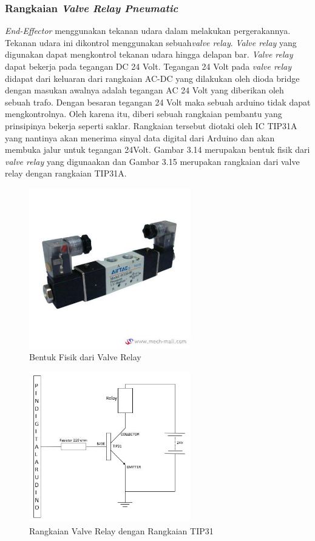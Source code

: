 \subsubsection{Rangkaian \textit{Valve Relay Pneumatic}}
\textit{End-Effector} menggunakan tekanan udara dalam melakukan pergerakannya. Tekanan udara ini dikontrol menggunakan sebuah\textit{valve relay}. \textit{Valve relay} yang digunakan dapat mengkontrol tekanan udara hingga delapan bar. \textit{Valve relay} dapat bekerja pada tegangan DC 24 Volt. Tegangan 24 Volt pada \textit{valve relay} didapat dari keluaran dari rangkaian AC-DC yang dilakukan oleh dioda bridge dengan masukan awalnya adalah tegangan AC 24 Volt yang diberikan oleh sebuah trafo. Dengan besaran tegangan 24 Volt maka sebuah arduino tidak dapat mengkontrolnya. Oleh karena itu, diberi sebuah rangkaian pembantu yang prinsipinya bekerja seperti saklar. Rangkaian tersebut diotaki oleh IC TIP31A yang nantinya akan menerima sinyal data digital dari Arduino dan akan membuka jalur untuk tegangan 24Volt. Gambar 3.14 merupakan bentuk fisik dari \textit{valve relay} yang digunaakan dan Gambar 3.15 merupakan rangkaian dari valve relay dengan rangkaian TIP31A.
\begin{figure}[H]
	\centering
	\includegraphics[width=7cm]{gambar/relay.jpg}
	\caption{Bentuk Fisik dari Valve Relay}
\end{figure}
\begin{figure}[H]
	\centering
	\includegraphics[width=7cm]{gambar/relay3.jpg}
	\caption{Rangkaian Valve Relay dengan Rangkaian TIP31}
\end{figure}
